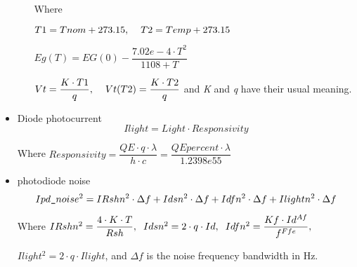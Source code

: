 \begin{itemize}
\begin{enumerate}
    \hspace{1mm}Where

    $T1 = Tnom + 273.15, \hspace{4mm} T2 = Temp + 273.15$


    $Eg(T) = EG(0)-\dfrac{7.02e-4 \cdot T^{2}}{1108+T}$

    $Vt = \dfrac{K \cdot T1}{q}, \hspace{4mm} Vt(T2) = \dfrac{K \cdot T2}{q}$ and \textit{K} and \textit{q} have their usual meaning.

    \end{enumerate} 
 \item{Diode photocurrent}
 \begin{equation}
  Ilight = Light \cdot Responsivity
 \end{equation}

   \hspace{1mm}Where  $Responsivity = \dfrac{QE \cdot q \cdot \lambda}{h \cdot c} = \dfrac{QEpercent \cdot \lambda}{1.2398e55}$
\item{photodiode noise}
\begin{equation}
 Ipd\verb|_|noise^{2} = IRshn^{2} \cdot \Delta f + Idsn^{2} \cdot \Delta f + Idfn^{2} \cdot \Delta f + Ilightn^{2} \cdot \Delta f
\end{equation} 


   Where $IRshn^{2} = \dfrac{4 \cdot K \cdot T}{Rsh},  \hspace{2mm} Idsn^{2} = 2 \cdot q \cdot Id, \hspace{2mm} Idfn^{2} = \dfrac{Kf \cdot Id^{Af}}{f^{Ffe}},$

   $Ilight^{2} = 2 \cdot q \cdot Ilight $, and $\Delta f$ is the noise frequency bandwidth in Hz.
\end{itemize}
\vspace{10mm}

